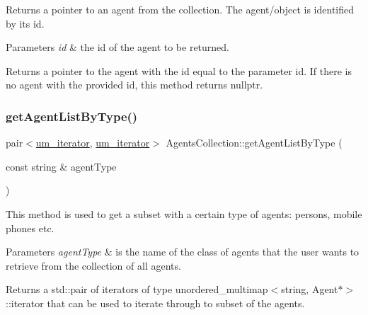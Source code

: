 Returns a pointer to an agent from the collection. The agent/object is identified by its id. 
\begin{DoxyParams}{Parameters}
{\em id} & the id of the agent to be returned. \\
\hline
\end{DoxyParams}
\begin{DoxyReturn}{Returns}
a pointer to the agent with the id equal to the parameter id. If there is no agent with the provided id, this method returns nullptr. 
\end{DoxyReturn}
\mbox{\label{class_agents_collection_a4ab0c8e86e6f6ebceb12bd2bd8f9f758}} 
\subsubsection{\texorpdfstring{getAgentListByType()}{getAgentListByType()}}
{\footnotesize\ttfamily pair$<$\mbox{\hyperlink{_agents_collection_8h_afde47bc45d604b8b8c72755072376679}{um\+\_\+iterator}}, \mbox{\hyperlink{_agents_collection_8h_afde47bc45d604b8b8c72755072376679}{um\+\_\+iterator}}$>$ Agents\+Collection\+::get\+Agent\+List\+By\+Type (\begin{DoxyParamCaption}\item[{const string \&}]{agent\+Type }\end{DoxyParamCaption})}

This method is used to get a subset with a certain type of agents\+: persons, mobile phones etc. 
\begin{DoxyParams}{Parameters}
{\em agent\+Type} & is the name of the class of agents that the user wants to retrieve from the collection of all agents. \\
\hline
\end{DoxyParams}
\begin{DoxyReturn}{Returns}
a std\+::pair of iterators of type unordered\+\_\+multimap$<$string, Agent$\ast$$>$\+::iterator that can be used to iterate through to subset of the agents. 
\end{DoxyReturn}
\mbox{\label{class_agents_collection_a193faf9793030715e8edeb65137156e9}} 
